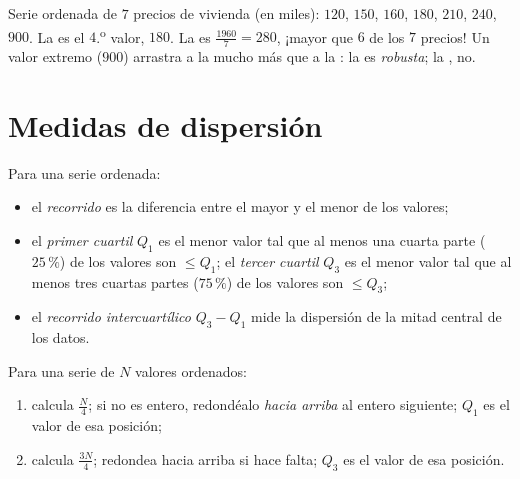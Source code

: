 \begin{example}\label{ex:g10:stats:median}
Serie ordenada de $7$ precios de vivienda (en miles): $120$, $150$, $160$,
$180$, $210$, $240$, $900$. La  es el $4$.\textsuperscript{o}
valor, $180$. La  es $\frac{1960}{7} = 280$, ¡mayor que $6$ de los
$7$ precios! Un valor extremo ($900$) arrastra a la  mucho más que a
la : la  es \emph{robusta}; la , no.
\end{example}

\section{Medidas de dispersión}

\begin{definition}\label{def:g10:stats:quartiles}
Para una serie ordenada:
\begin{itemize}
  \item el \emph{recorrido} es la diferencia entre el
        mayor y el menor de los valores;
  \item el \emph{primer cuartil} $Q_1$ es el menor valor
        tal que al menos una cuarta parte ($25\,\%$) de los valores son
        $\leq Q_1$; el \emph{tercer cuartil} $Q_3$ es el menor valor tal
        que al menos tres cuartas partes ($75\,\%$) de los valores son
        $\leq Q_3$;
  \item el \emph{recorrido intercuartílico} $Q_3 - Q_1$ mide la dispersión de la mitad
        central de los datos.
\end{itemize}
\end{definition}

\begin{method}\label{met:g10:stats:quartiles}
Para una serie de $N$ valores ordenados:
\begin{enumerate}
  \item calcula $\frac N4$; si no es entero, redondéalo \emph{hacia
        arriba} al entero siguiente; $Q_1$ es el valor de esa posición;
  \item calcula $\frac{3N}{4}$; redondea hacia arriba si hace falta;
        $Q_3$ es el valor de esa posición.
\end{enumerate}
\end{method}

